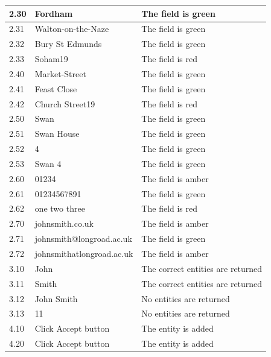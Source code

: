\begin{landscape}
\begin{center}
\begin{longtable}{|p{2cm}|p{5cm}|p{8cm}|}
        2.30 & Fordham & The field is green \\ \hline
        2.31 & Walton-on-the-Naze & The field is green \\ \hline
        2.32 & Bury St Edmunds & The field is green \\ \hline
        2.33 & Soham19 & The field is red \\ \hline

        2.40 & Market-Street & The field is green \\ \hline
        2.41 & Feast Close & The field is green \\ \hline
        2.42 & Church Street19 & The field is red \\ \hline
        
        2.50 & Swan & The field is green \\ \hline
        2.51 & Swan House & The field is green \\ \hline
        2.52 & 4 & The field is green \\ \hline
        2.53 & Swan 4 & The field is green \\ \hline
        
        2.60 & 01234 & The field is amber \\ \hline
        2.61 & 01234567891 & The field is green \\ \hline
        2.62 & one two three & The field is red \\ \hline
       
        2.70 & johnsmith.co.uk & The field is amber \\ \hline
        2.71 & johnsmith@longroad.ac.uk & The field is green \\ \hline
        2.72 & johnsmithatlongroad.ac.uk & The field is amber \\ \hline
        
        3.10 & John & The correct entities are returned \\ \hline
        3.11 & Smith & The correct entities are returned \\ \hline
        3.12 & John Smith &  No entities are returned \\ \hline
        3.13 & 11 & No entities are returned \\ \hline
        
        4.10 & Click Accept button & The entity is added \\ \hline
        
        4.20 & Click Accept button & The entity is added \\ \hline
        

\end{longtable}
\end{center}
\end{landscape}
